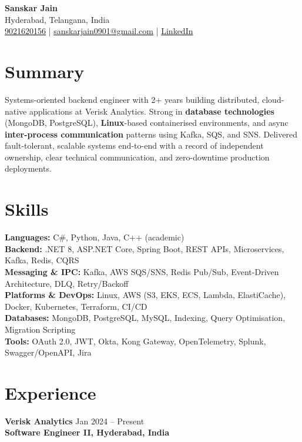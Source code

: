 \documentclass[letterpaper,10pt]{article}
\begin{document}
\begin{center}
    {\LARGE \textbf{Sanskar Jain}} \\
    Hyderabad, Telangana, India \\
    \href{tel:9021620156}{9021620156} \;|\;
    \href{mailto:sanskarjain0901@gmail.com}{sanskarjain0901@gmail.com} \;|\;
    \href{https://www.linkedin.com/in/sanskar-jain0901/}{LinkedIn}
\end{center}

\vspace{3pt}

\section*{Summary}
Systems-oriented backend engineer with 2+ years building distributed, cloud-native applications at Verisk Analytics.
Strong in \textbf{database technologies} (MongoDB, PostgreSQL), \textbf{Linux}-based containerised environments, and async \textbf{inter-process communication} patterns using Kafka, SQS, and SNS.
Delivered fault-tolerant, scalable systems end-to-end with a record of independent ownership, clear technical communication, and zero-downtime production deployments.

\section*{Skills}
\textbf{Languages:} C\#, Python, Java, C++ (academic) \\
\textbf{Backend:} .NET 8, ASP.NET Core, Spring Boot, REST APIs, Microservices, Kafka, Redis, CQRS \\
\textbf{Messaging \& IPC:} Kafka, AWS SQS/SNS, Redis Pub/Sub, Event-Driven Architecture, DLQ, Retry/Backoff \\
\textbf{Platforms \& DevOps:} Linux, AWS (S3, EKS, ECS, Lambda, ElastiCache), Docker, Kubernetes, Terraform, CI/CD \\
\textbf{Databases:} MongoDB, PostgreSQL, MySQL, Indexing, Query Optimisation, Migration Scripting \\
\textbf{Tools:} OAuth 2.0, JWT, Okta, Kong Gateway, OpenTelemetry, Splunk, Swagger/OpenAPI, Jira

\section*{Experience}

\textbf{Verisk Analytics} \hfill Jan 2024 -- Present \\
\textbf{Software Engineer II, Hyderabad, India}
\end{document}
